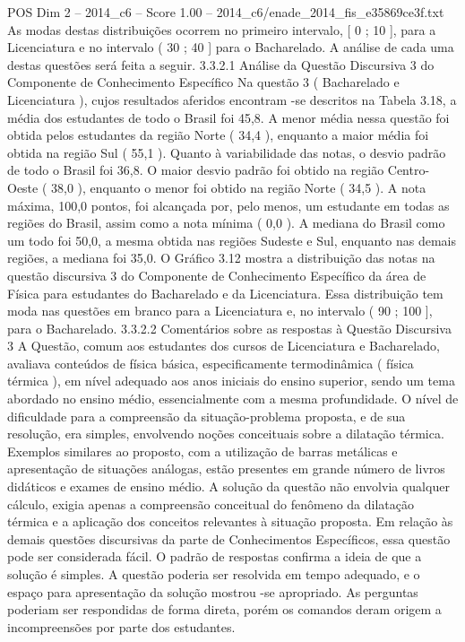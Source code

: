\begin{textsample}{POS Dim 2 – 2014\_c6 – Score 1.00 – 2014\_c6/enade\_2014\_fis\_e35869ce3f.txt}
As modas destas distribuições ocorrem no primeiro intervalo, [ 0 ; 10 ], para a Licenciatura e no intervalo ( 30 ; 40 ] para o Bacharelado.
A análise de cada uma destas questões será feita a seguir. 3.3.2.1 Análise da Questão Discursiva 3 do Componente de Conhecimento Específico Na questão 3 ( Bacharelado e Licenciatura ), cujos resultados aferidos encontram -se descritos na Tabela 3.18, a média dos estudantes de todo o Brasil foi 45,8.
A menor média nessa questão foi obtida pelos estudantes da região Norte ( 34,4 ), enquanto a maior média foi obtida na região Sul ( 55,1 ).
Quanto à variabilidade das notas, o desvio padrão de todo o Brasil foi 36,8.
O maior desvio padrão foi obtido na região Centro-Oeste ( 38,0 ), enquanto o menor foi obtido na região Norte ( 34,5 ).
A nota máxima, 100,0 pontos, foi alcançada por, pelo menos, um estudante em todas as regiões do Brasil, assim como a nota mínima ( 0,0 ).
A mediana do Brasil como um todo foi 50,0, a mesma obtida nas regiões Sudeste e Sul, enquanto nas demais regiões, a mediana foi 35,0.
O Gráfico 3.12 mostra a distribuição das notas na questão discursiva 3 do Componente de Conhecimento Específico da área de Física para estudantes do Bacharelado e da Licenciatura.
Essa distribuição tem moda nas questões em branco para a Licenciatura e, no intervalo ( 90 ; 100 ], para o Bacharelado. 3.3.2.2 Comentários sobre as respostas à Questão Discursiva 3 A Questão, comum aos estudantes dos cursos de Licenciatura e Bacharelado, avaliava conteúdos de física básica, especificamente termodinâmica ( física térmica ), em nível adequado aos anos iniciais do ensino superior, sendo um tema abordado no ensino médio, essencialmente com a mesma profundidade.
O nível de dificuldade para a compreensão da situação-problema proposta, e de sua resolução, era simples, envolvendo noções conceituais sobre a dilatação térmica.
Exemplos similares ao proposto, com a utilização de barras metálicas e apresentação de situações análogas, estão presentes em grande número de livros didáticos e exames de ensino médio.
A solução da questão não envolvia qualquer cálculo, exigia apenas a compreensão conceitual do fenômeno da dilatação térmica e a aplicação dos conceitos relevantes à situação proposta.
Em relação às demais questões discursivas da parte de Conhecimentos Específicos, essa questão pode ser considerada fácil.
O padrão de respostas confirma a ideia de que a solução é simples.
A questão poderia ser resolvida em tempo adequado, e o espaço para apresentação da solução mostrou -se apropriado.
As perguntas poderiam ser respondidas de forma direta, porém os comandos deram origem a incompreensões por parte dos estudantes.

\end{textsample}
